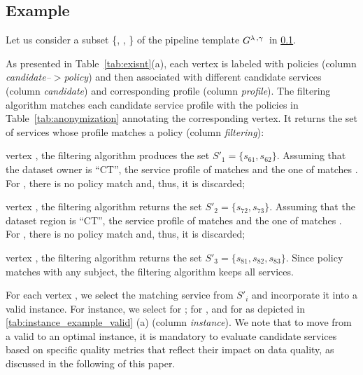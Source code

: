 \subsection{Example}\label{sec:example_instace}


  Let us consider a subset \{, , \} of the pipeline template $G^{\lambda\,,\gamma\,}$ in \cref{sec:example_instace}.

  As presented in Table~\ref{tab:exisnt}(a), each vertex is labeled with policies (column \emph{candidate--$>$policy}) and then associated with different candidate services (column \emph{candidate}) and corresponding profile (column \emph{profile}). The filtering algorithm matches each candidate service profile with the policies in Table~\ref{tab:anonymization} annotating the corresponding vertex. It returns the set of services whose profile matches a policy (column \emph{filtering}):
  \begin{enumerate*}[label=\textit{\roman*})]
    \item vertex , the filtering algorithm produces the set $S'_1=\{s_{61},s_{62}\}$. Assuming that the dataset owner is ``CT'', the service profile of  matches  and the one of  matches . For , there is no policy match and, thus, it is discarded;
    \item vertex , the filtering algorithm returns the set $S'_2=\{s_{72},s_{73}\}$. Assuming that the dataset region is ``CT'', the service profile of  matches  and the one of  matches . For , there is no policy match and, thus, it is discarded;
    \item vertex , the filtering algorithm returns the set $S'_3=\{s_{81},s_{82},s_{83}\}$. Since policy  matches with any subject, the filtering algorithm keeps all services.
  \end{enumerate*}

  For each vertex , we select the matching service  from $S'_i$ and incorporate it into a valid instance. For instance, we select  for ;  for , and  for 
  as depicted in \cref{tab:instance_example_valid} (a) (column \emph{instance}). We note that to move from a valid to an optimal instance, it is mandatory to evaluate candidate services based on specific quality metrics that reflect their impact on data quality, as discussed in the following of this paper. 

